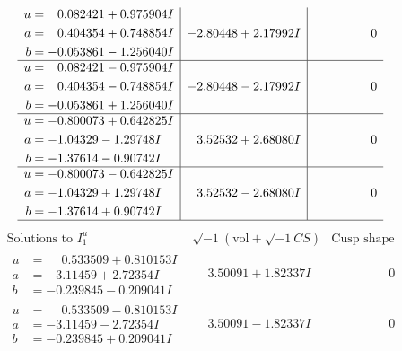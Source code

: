 \documentclass[1p]{elsarticle_modified}
\theoremstyle{definition}
\newcommand{\I}{\sqrt{-1}}
\begin{document}
$$\begin{array}{c|c|c}
\begin{aligned}
u &= \phantom{-}0.082421 + 0.975904 I \\
a &= \phantom{-}0.404354 + 0.748854 I \\
b &= -0.053861 - 1.256040 I\end{aligned}
 & -2.80448 + 2.17992 I & \phantom{-0.000000 } 0 \\ \hline\begin{aligned}
u &= \phantom{-}0.082421 - 0.975904 I \\
a &= \phantom{-}0.404354 - 0.748854 I \\
b &= -0.053861 + 1.256040 I\end{aligned}
 & -2.80448 - 2.17992 I & \phantom{-0.000000 } 0 \\ \hline\begin{aligned}
u &= -0.800073 + 0.642825 I \\
a &= -1.04329 - 1.29748 I \\
b &= -1.37614 - 0.90742 I\end{aligned}
 & \phantom{-}3.52532 + 2.68080 I & \phantom{-0.000000 } 0 \\ \hline\begin{aligned}
u &= -0.800073 - 0.642825 I \\
a &= -1.04329 + 1.29748 I \\
b &= -1.37614 + 0.90742 I\end{aligned}
 & \phantom{-}3.52532 - 2.68080 I & \phantom{-0.000000 } 0\\
 \hline 
 \end{array}$$\newpage$$\begin{array}{c|c|c}  
\text{Solutions to }I^u_{1}& \I (\text{vol} + \sqrt{-1}CS) & \text{Cusp shape}\\
 \hline 
\begin{aligned}
u &= \phantom{-}0.533509 + 0.810153 I \\
a &= -3.11459 + 2.72354 I \\
b &= -0.239845 - 0.209041 I\end{aligned}
 & \phantom{-}3.50091 + 1.82337 I & \phantom{-0.000000 } 0 \\ \hline\begin{aligned}
u &= \phantom{-}0.533509 - 0.810153 I \\
a &= -3.11459 - 2.72354 I \\
b &= -0.239845 + 0.209041 I\end{aligned}
 & \phantom{-}3.50091 - 1.82337 I & \phantom{-0.000000 } 0 \\ \hline\begin{aligned}

\end{aligned}
\end{array}$$
\end{document}
